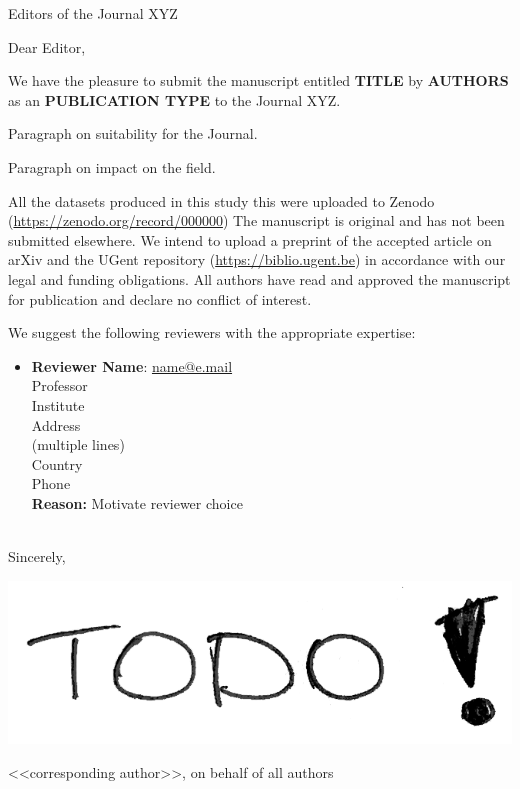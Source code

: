 \documentclass[11pt]{letter}
\begin{document}
\begin{letter}{Editors of the Journal XYZ}

\opening{Dear Editor,}

We have the pleasure to submit the manuscript entitled
\textbf{TITLE}
by \textbf{AUTHORS} as an \textbf{PUBLICATION TYPE} to the Journal XYZ.

Paragraph on suitability for the Journal.

Paragraph on impact on the field.

All the datasets produced in this study this were uploaded to Zenodo (\url{https://zenodo.org/record/000000}) The manuscript is original and has not been submitted elsewhere.
We intend to upload a preprint of the accepted article on arXiv and the UGent repository (\url{https://biblio.ugent.be}) in accordance with our legal and funding obligations.
All authors have read and approved the manuscript for publication and declare no conflict of interest.

We suggest the following reviewers with the appropriate expertise:
%
\begin{itemize}[itemsep=12pt]
    \item
    \begin{minipage}[t]{\linewidth}
    \textbf{Reviewer Name}: \href{mailto:name@e.mail}{name@e.mail} \\
    Professor \\
    Institute \\
    Address \\
    (multiple lines) \\
    Country \\
    Phone \\
    \textbf{Reason:} Motivate reviewer choice
    \end{minipage}
\end{itemize}

\-\\[1em]
Sincerely,

\includegraphics[height=8\medskipamount]{signature}

<<corresponding author>>, on behalf of all authors


\end{letter}
\end{document}
